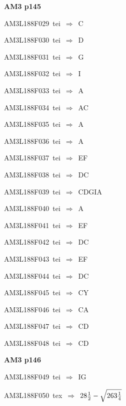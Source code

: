 \par\vfill\eject
{\bf\hfill AM3 p145\hfill\hbox{}}\par\bigskip
{\sixrm AM3L188F029\ {\sixit tei}\ }$\Rightarrow$\ C\par\smallskip
{\sixrm AM3L188F030\ {\sixit tei}\ }$\Rightarrow$\ D\par\smallskip
{\sixrm AM3L188F031\ {\sixit tei}\ }$\Rightarrow$\ G\par\smallskip
{\sixrm AM3L188F032\ {\sixit tei}\ }$\Rightarrow$\ I\par\smallskip
{\sixrm AM3L188F033\ {\sixit tei}\ }$\Rightarrow$\ A\par\smallskip
{\sixrm AM3L188F034\ {\sixit tei}\ }$\Rightarrow$\ AC\par\smallskip
{\sixrm AM3L188F035\ {\sixit tei}\ }$\Rightarrow$\ A\par\smallskip
{\sixrm AM3L188F036\ {\sixit tei}\ }$\Rightarrow$\ A\par\smallskip
{\sixrm AM3L188F037\ {\sixit tei}\ }$\Rightarrow$\ EF\par\smallskip
{\sixrm AM3L188F038\ {\sixit tei}\ }$\Rightarrow$\ DC\par\smallskip
{\sixrm AM3L188F039\ {\sixit tei}\ }$\Rightarrow$\ CDGIA\par\smallskip
{\sixrm AM3L188F040\ {\sixit tei}\ }$\Rightarrow$\ A\par\smallskip
{\sixrm AM3L188F041\ {\sixit tei}\ }$\Rightarrow$\ EF\par\smallskip
{\sixrm AM3L188F042\ {\sixit tei}\ }$\Rightarrow$\ DC\par\smallskip
{\sixrm AM3L188F043\ {\sixit tei}\ }$\Rightarrow$\ EF\par\smallskip
{\sixrm AM3L188F044\ {\sixit tei}\ }$\Rightarrow$\ DC\par\smallskip
{\sixrm AM3L188F045\ {\sixit tei}\ }$\Rightarrow$\ CY\par\smallskip
{\sixrm AM3L188F046\ {\sixit tei}\ }$\Rightarrow$\ CA\par\smallskip
{\sixrm AM3L188F047\ {\sixit tei}\ }$\Rightarrow$\ CD\par\smallskip
{\sixrm AM3L188F048\ {\sixit tei}\ }$\Rightarrow$\ CD\par\smallskip

\par\vfill\eject
{\bf\hfill AM3 p146\hfill\hbox{}}\par\bigskip
{\sixrm AM3L188F049\ {\sixit tei}\ }$\Rightarrow$\ IG\par\smallskip
{\sixrm AM3L188F050\ {\sixit tex}\ }$\Rightarrow$\ $28{{1\over 2}} - \sqrt{263{{1\over 4}}}$\par\smallskip

